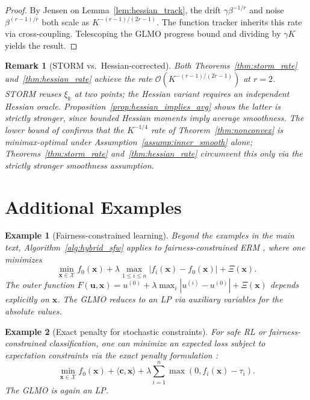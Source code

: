 \documentclass{article}
\newcommand{\cX}{\mathcal{X}}
\def\vc{{\bm{c}}}
\def\vu{{\bm{u}}}
\def\vx{{\bm{x}}}
\newtheorem{example}{Example}
\newtheorem{remark}{Remark}
\begin{document}
\begin{proof}
By Jensen on Lemma~\ref{lem:hessian_track}, the drift $\gamma\beta^{-1/r}$ and noise $\beta^{(r-1)/r}$ both scale as $K^{-(r-1)/(2r-1)}$. The function tracker inherits this rate via cross-coupling. Telescoping the GLMO progress bound and dividing by $\gamma K$ yields the result.
\end{proof}

\begin{remark}[STORM vs.\ Hessian-corrected]
Both Theorems~\ref{thm:storm_rate} and~\ref{thm:hessian_rate} achieve the rate $\mathcal{O}(K^{-(r-1)/(2r-1)})$ at $r = 2$. STORM reuses $\xi_k$ at two points; the Hessian variant requires an independent Hessian oracle. Proposition~\ref{prop:hessian_implies_avg} shows the latter is strictly stronger, since bounded Hessian moments imply average smoothness. The lower bound of \citet{arjevani2023lower} confirms that the $K^{-1/4}$ rate of Theorem~\ref{thm:nonconvex} is minimax-optimal under Assumption~\ref{assump:inner_smooth} alone; Theorems~\ref{thm:storm_rate} and~\ref{thm:hessian_rate} circumvent this only via the strictly stronger smoothness assumption.
\end{remark}

\section{Additional Examples} \label{sec:examples_appendix}

\begin{example}[Fairness-constrained learning]
Beyond the examples in the main text, Algorithm~\ref{alg:hybrid_sfw} applies to fairness-constrained ERM \citep{agarwal2018reductions, donini2018empirical}, where one minimizes
\[
\min_{\vx \in \cX} f_0(\vx) + \lambda \max_{1 \le i \le n}|f_i(\vx) - f_0(\vx)| + \Xi(\vx).
\]
The outer function $F(\vu, \vx) = u^{(0)} + \lambda\max_i|u^{(i)} - u^{(0)}| + \Xi(\vx)$ depends explicitly on $\vx$. The GLMO reduces to an LP via auxiliary variables for the absolute values.
\end{example}

\begin{example}[Exact penalty for stochastic constraints]
For safe RL or fairness-constrained classification, one can minimize an expected loss subject to expectation constraints via the exact penalty formulation \citep{cotter2019two}:
\[
\min_{\vx \in \cX} f_0(\vx) + \langle \vc, \vx \rangle + \lambda \sum_{i=1}^n \max(0, f_i(\vx) - \tau_i).
\]
The GLMO is again an LP.
\end{example}
\end{document}
